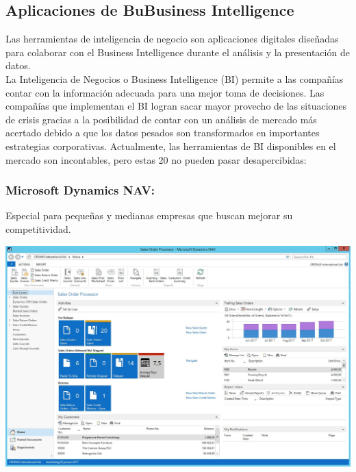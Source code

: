 \subsection{Aplicaciones de BuBusiness Intelligence } \label{sec:nada}


Las herramientas de inteligencia de negocio son aplicaciones digitales diseñadas para colaborar con el Business Intelligence durante el análisis y la presentación de datos.\\
La Inteligencia de Negocios o Business Intelligence (BI) permite a las compañías contar con la información adecuada para una mejor toma de decisiones.  Las compañías que implementan el BI logran sacar mayor provecho de las situaciones de crisis gracias a la posibilidad de contar con un análisis de mercado más acertado debido a que los datos pesados son transformados en importantes estrategias corporativas.
Actualmente, las herramientas de BI disponibles en el mercado son incontables, pero estas 20 no pueden pasar desapercibidas:

\subsubsection{Microsoft Dynamics NAV: }\label{sec:nada2} 
Especial para pequeñas y medianas empresas que buscan mejorar su competitividad.
	\begin{center}
	\includegraphics[width=15cm]{./Imagenes/BIimagen1}
	\end{center}

